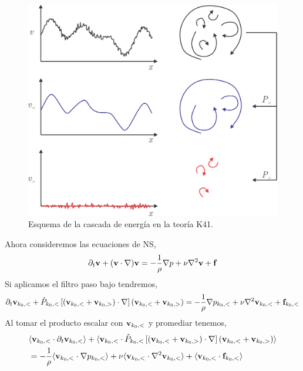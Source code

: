 \documentclass[executivepaper,12pt]{article}
\numberwithin{equation}{section}
\begin{document}
 \begin{figure}[H]
 	\begin{center}
 		\includegraphics[scale=0.9]{energyBalance}
 	\end{center}
 	\caption{Esquema de la cascada de energía en la teoría K41. }
 	\label{fig-filtro}
 \end{figure}
 
 Ahora consideremos las ecuaciones de NS, 
 \begin{equation*}
 	\partial_t \vb{v}+(\vb{v}\cdot\vb{\nabla})\vb{v}=-\frac{1}{\rho}\vb{\nabla}p+\nu\nabla^2\vb{v}+\vb{f}
 \end{equation*}
 Si aplicamos el filtro paso bajo tendremos,
 \begin{equation*}
 	\partial_t \vb{v}_{k_0,<}+\hat{P}_{k_0,<}\left[(\vb{v}_{k_0,<}+\vb{v}_{k_0,>})\cdot\vb{\nabla}\right](\vb{v}_{k_0,<}+\vb{v}_{k_0,>})=-\frac{1}{\rho}\vb{\nabla}p_{k_0,<}+\nu\nabla^2\vb{v}_{k_0,<}+\vb{f}_{k_0,<}
 \end{equation*}
 Al tomar el producto escalar con $\vb{v}_{k_0,<}$ y promediar tenemos,
 \begin{align*}
 	&\langle \vb{v}_{k_0,<} \cdot \partial_t \vb{v}_{k_0,<} \rangle+\langle \vb{v}_{k_0,<} \cdot \hat{P}_{k_0,<}\left[(\vb{v}_{k_0,<}+\vb{v}_{k_0,>})\cdot\vb{\nabla}\right](\vb{v}_{k_0,<}+\vb{v}_{k_0,>})\rangle\\
 	&=-\frac{1}{\rho}\langle\vb{v}_{k_0,<}\cdot\vb{\nabla}p_{k_0,<}\rangle+\nu\langle \vb{v}_{k_0,<}\cdot\nabla^2\vb{v}_{k_0,<}\rangle+\langle \vb{v}_{k_0,<}\cdot \vb{f}_{k_0,<}\rangle
 \end{align*}
 
\end{document}
